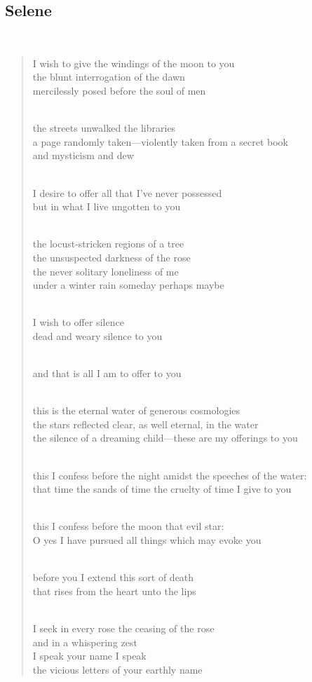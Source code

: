 \documentclass[a4paper, 12pt]{article}
\begin{document}
\pagebreak

\subsection{Selene}
~ 
\begin{verse}
    
I wish to give the windings of the moon to you\\
the blunt interrogation of the dawn\\
mercilessly posed before the soul of men\\
~ 

the streets unwalked the libraries\\
a page randomly taken—violently taken from a secret book\\
and mysticism and dew\\
~ 

I desire to offer all that I’ve never possessed\\
but in what I live ungotten to you\\
~ 

the locust-stricken regions of a tree\\
the unsuspected darkness of the rose\\
the never solitary loneliness of me\\
under a winter rain someday perhaps maybe\\
~ 

I wish to offer silence\\
dead and weary silence to you\\
~ 

and that is all I am to offer to you\\
~ 

this is the eternal water of generous cosmologies\\
the stars reflected clear, as well eternal, in the water\\
the silence of a dreaming child—these are my offerings to you\\
~ 

this I confess before the night amidst the speeches of the water:\\
that time the sands of time the cruelty of time I give to you\\
~ 

this I confess before the moon that evil star:\\
O yes I have pursued all things which may evoke you\\
~ 

before you I extend this sort of death\\
that rises from the heart unto the lips\\
~ 

I seek in every rose the ceasing of the rose\\
and in a whispering zest\\
I speak your name I speak\\
the vicious letters of your earthly name\\
\end{verse}
\end{document}
